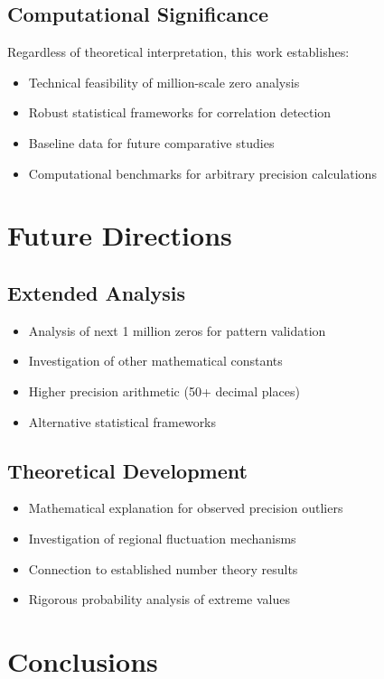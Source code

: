\documentclass[12pt, a4paper]{article}
\begin{document}
\subsection{Computational Significance}
Regardless of theoretical interpretation, this work establishes:
\begin{itemize}
    \item Technical feasibility of million-scale zero analysis
    \item Robust statistical frameworks for correlation detection
    \item Baseline data for future comparative studies
    \item Computational benchmarks for arbitrary precision calculations
\end{itemize}

\section{Future Directions}

\subsection{Extended Analysis}
\begin{itemize}
    \item Analysis of next 1 million zeros for pattern validation
    \item Investigation of other mathematical constants
    \item Higher precision arithmetic (50+ decimal places)
    \item Alternative statistical frameworks
\end{itemize}

\subsection{Theoretical Development}
\begin{itemize}
    \item Mathematical explanation for observed precision outliers
    \item Investigation of regional fluctuation mechanisms
    \item Connection to established number theory results
    \item Rigorous probability analysis of extreme values
\end{itemize}

\section{Conclusions}
\end{document}
